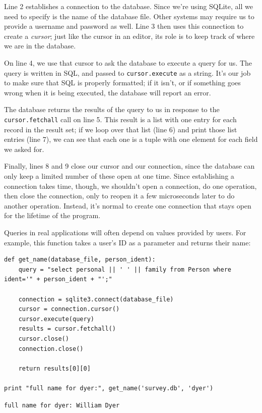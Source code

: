 \documentclass[]{book}
\newcommand{\gdef}[2]{\emph{#2}}
\begin{document}
Line 2 establishes a connection to the database. Since we're using
SQLite, all we need to specify is the name of the database file. Other
systems may require us to provide a username and password as well. Line
3 then uses this connection to create a \gdef{g:cursor}{cursor};
just like the cursor in an editor, its role is to keep track of where we
are in the database.

On line 4, we use that cursor to ask the database to execute a query for
us. The query is written in SQL, and passed to \texttt{cursor.execute}
as a string. It's our job to make sure that SQL is properly formatted;
if it isn't, or if something goes wrong when it is being executed, the
database will report an error.

The database returns the results of the query to us in response to the
\texttt{cursor.fetchall} call on line 5. This result is a list with one
entry for each record in the result set; if we loop over that list (line
6) and print those list entries (line 7), we can see that each one is a
tuple with one element for each field we asked for.

Finally, lines 8 and 9 close our cursor and our connection, since the
database can only keep a limited number of these open at one time. Since
establishing a connection takes time, though, we shouldn't open a
connection, do one operation, then close the connection, only to reopen
it a few microseconds later to do another operation. Instead, it's
normal to create one connection that stays open for the lifetime of the
program.

Queries in real applications will often depend on values provided by
users. For example, this function takes a user's ID as a parameter and
returns their name:

\begin{verbatim}
def get_name(database_file, person_ident):
    query = "select personal || ' ' || family from Person where ident='" + person_ident + "';"

    connection = sqlite3.connect(database_file)
    cursor = connection.cursor()
    cursor.execute(query)
    results = cursor.fetchall()
    cursor.close()
    connection.close()

    return results[0][0]

print "full name for dyer:", get_name('survey.db', 'dyer')
\end{verbatim}

\begin{verbatim}
full name for dyer: William Dyer
\end{verbatim}
\end{document}
